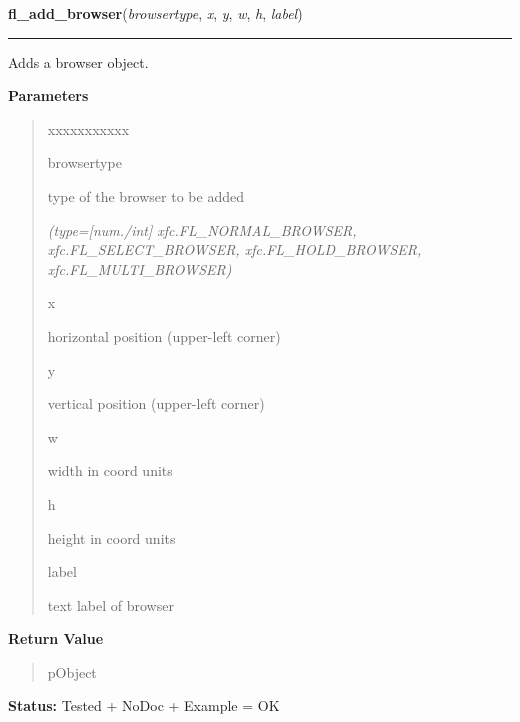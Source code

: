     \label{xformslib:library:fl_add_browser}

    \vspace{0.5ex}

\hspace{.8\funcindent}\begin{boxedminipage}{\funcwidth}

    \raggedright \textbf{fl\_add\_browser}(\textit{browsertype}, \textit{x}, \textit{y}, \textit{w}, \textit{h}, \textit{label})

    \vspace{-1.5ex}

    \rule{\textwidth}{0.5\fboxrule}
\setlength{\parskip}{2ex}
    Adds a browser object.

\setlength{\parskip}{1ex}
      \textbf{Parameters}
      \vspace{-1ex}

      \begin{quote}
        \begin{Ventry}{xxxxxxxxxxx}

          \item[browsertype]

          type of the browser to be added

            {\it (type=[num./int] xfc.FL\_NORMAL\_BROWSER, xfc.FL\_SELECT\_BROWSER, 
xfc.FL\_HOLD\_BROWSER, xfc.FL\_MULTI\_BROWSER)}

          \item[x]

          horizontal position (upper-left corner)

          \item[y]

          vertical position (upper-left corner)

          \item[w]

          width in coord units

          \item[h]

          height in coord units

          \item[label]

          text label of browser

        \end{Ventry}

      \end{quote}

      \textbf{Return Value}
    \vspace{-1ex}

      \begin{quote}
      pObject

      \end{quote}

\textbf{Status:} Tested + NoDoc + Example = OK



    \end{boxedminipage}


